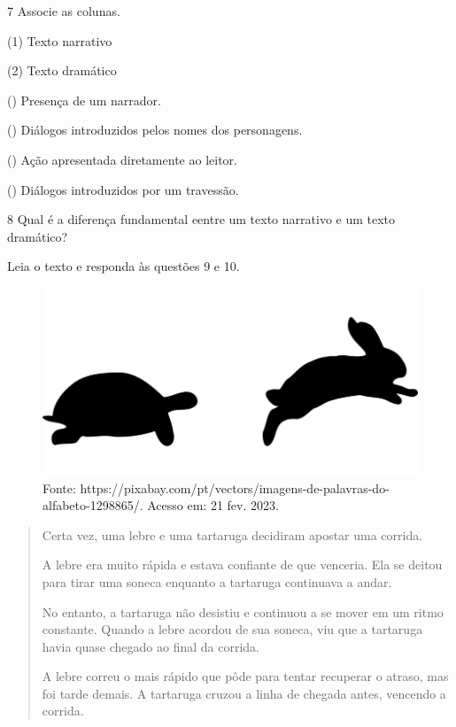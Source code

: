 
\num{7} Associe as colunas.

\begin{multicols}{2}
(1) Texto narrativo\medskip

(2) Texto dramático

\columnbreak

() Presença de um narrador.

() Diálogos introduzidos pelos nomes dos personagens.

() Ação apresentada diretamente ao leitor.

() Diálogos introduzidos por um travessão.
\end{multicols}

\num{8} Qual é a diferença fundamental eentre um texto narrativo e um texto dramático?



Leia o texto e responda às questões 9 e 10.

\begin{figure}[htpb!]
\includegraphics[width=.5\textwidth]{./imgs/img6.png}
\caption{Fonte: https://pixabay.com/pt/vectors/imagens-de-palavras-do-alfabeto-1298865/. Acesso em: 21 fev. 2023.}
\end{figure}

\begin{quote}
Certa vez, uma lebre e uma tartaruga decidiram apostar uma corrida.

A lebre era muito rápida e estava confiante de que venceria. Ela se
deitou para tirar uma soneca enquanto a tartaruga continuava a andar.

No entanto, a tartaruga não desistiu e continuou a se mover em um ritmo
constante. Quando a lebre acordou de sua soneca, viu que a tartaruga
havia quase chegado ao final da corrida.

A lebre correu o mais rápido que pôde para tentar recuperar o atraso,
mas foi tarde demais. A tartaruga cruzou a linha de chegada antes,
vencendo a corrida.
\end{quote}

